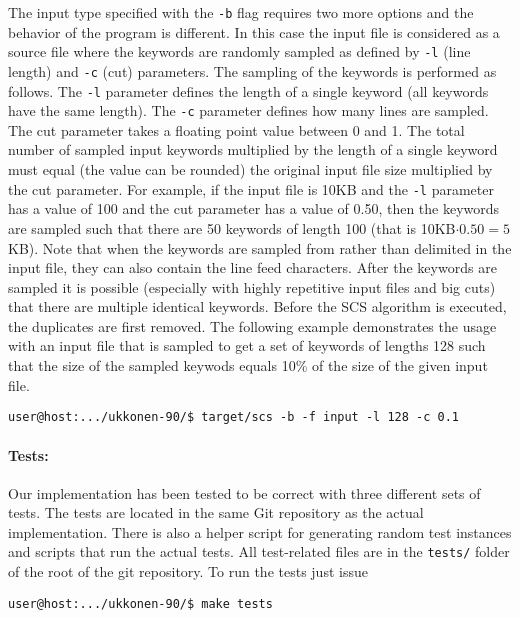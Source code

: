 \documentclass[english,twoside,censored,csm,algorithms-track-2020]{HYthesisML}
\theoremstyle{plain}
\theoremstyle{definition}
\begin{document}
The input type specified with the \texttt{-b} flag requires two more options and the behavior of
the program is
different. In this case the input file is considered as a source file where the keywords are randomly
sampled as defined by \texttt{-l} (line length) and \texttt{-c} (cut) parameters.
The sampling of the keywords is
performed as follows. The \texttt{-l} parameter defines the length of a single keyword (all keywords have
the same length). The \texttt{-c} parameter defines how many lines are sampled. The cut parameter takes a
floating point value between 0 and 1. The total number of sampled input keywords multiplied by
the length of a single keyword must equal (the value can be rounded) the original input file size
multiplied by the cut parameter. For example, if the input file is 10KB and the \texttt{-l}
parameter has a value
of 100 and the cut parameter has a value of 0.50, then the keywords are sampled such that there
are 50 keywords of length 100 (that is 10KB$\cdot 0.50 = 5$KB). Note that when the
keywords are sampled from rather than delimited in the input file, they can also contain the line
feed characters. After the keywords are sampled it is possible (especially with highly repetitive
input files and big cuts) that there are multiple identical keywords. Before the SCS algorithm
is executed, the duplicates are first removed. The following example
demonstrates the usage with an input file that is sampled to get a set of keywords of lengths 128
such that the size of the sampled keywods equals 10\% of the size of the given input file.

\begin{verbatim}
user@host:.../ukkonen-90/$ target/scs -b -f input -l 128 -c 0.1
\end{verbatim}

\paragraph{Tests:}
Our implementation has been tested to be correct with three different sets of tests. The tests are
located in the same Git repository as the actual implementation. There is also a helper script for
generating random test instances and scripts that run the actual tests.
All test-related files are in the \texttt{tests/} folder of the
root of the git repository. To run the tests just issue

\begin{verbatim}
user@host:.../ukkonen-90/$ make tests
\end{verbatim}
\end{document}
